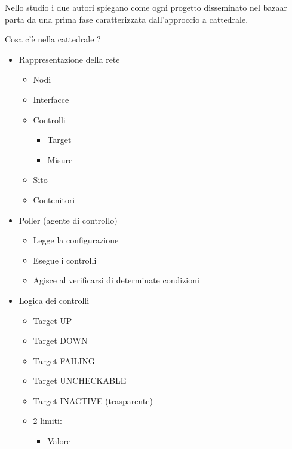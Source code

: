 \documentclass[a4wide,10pt,italian]{manual}
\begin{document}
Nello studio i due autori spiegano come ogni progetto disseminato nel bazaar parta da una prima fase
caratterizzata dall'approccio a cattedrale.

Cosa c'è nella cattedrale ?
\begin{itemize}
\item {} 
Rappresentazione della rete
\begin{itemize}
\item {} 
Nodi

\item {} 
Interfacce

\item {} 
Controlli
\begin{itemize}
\item {} 
Target

\item {} 
Misure

\end{itemize}

\item {} 
Sito

\item {} 
Contenitori

\end{itemize}

\item {} 
Poller (agente di controllo)
\begin{itemize}
\item {} 
Legge la configurazione

\item {} 
Esegue i controlli

\item {} 
Agisce al verificarsi di determinate condizioni

\end{itemize}

\item {} 
Logica dei controlli
\begin{itemize}
\item {} 
Target UP

\item {} 
Target DOWN

\item {} 
Target FAILING

\item {} 
Target UNCHECKABLE

\item {} 
Target INACTIVE (trasparente)

\item {} 
2 limiti:
\begin{itemize}
\item {} 
Valore


\end{itemize}
\end{itemize}
\end{itemize}
\end{document}
